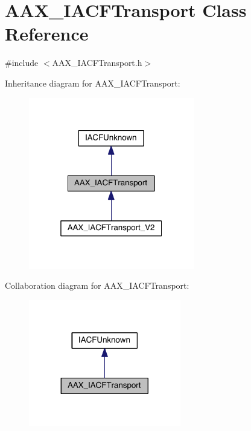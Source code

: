 \hypertarget{a00082}{}\section{A\+A\+X\+\_\+\+I\+A\+C\+F\+Transport Class Reference}
\label{a00082}


{\ttfamily \#include $<$A\+A\+X\+\_\+\+I\+A\+C\+F\+Transport.\+h$>$}



Inheritance diagram for A\+A\+X\+\_\+\+I\+A\+C\+F\+Transport\+:
\nopagebreak
\begin{figure}[H]
\begin{center}
\leavevmode
\includegraphics[width=205pt]{a00589}
\end{center}
\end{figure}


Collaboration diagram for A\+A\+X\+\_\+\+I\+A\+C\+F\+Transport\+:
\nopagebreak
\begin{figure}[H]
\begin{center}
\leavevmode
\includegraphics[width=188pt]{a00590}
\end{center}
\end{figure}


